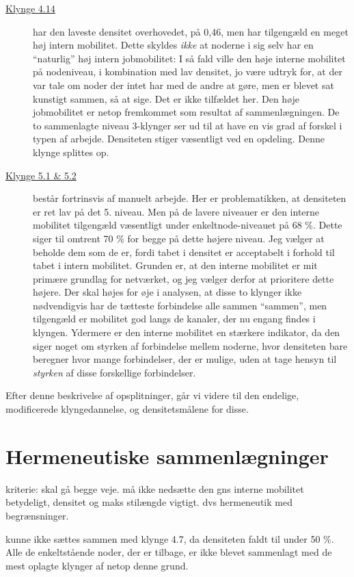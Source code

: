 \begin{description}
    \item[\underline{Klynge 4.14}] har den laveste densitet overhovedet, på 0,46, men har tilgengæld en meget høj intern mobilitet. Dette skyldes \emph{ikke} at noderne i sig selv har en “naturlig” høj intern jobmobilitet: I så fald ville den høje interne mobilitet på nodeniveau, i kombination med lav densitet, jo være udtryk for, at der  var tale om noder der intet har med de andre at gøre, men er blevet sat kunstigt sammen, så at sige. Det er ikke tilfældet her. Den høje jobmobilitet er netop fremkommet som resultat af sammenlægningen. De to sammenlagte niveau 3-klynger ser ud til at have en vis grad af forskel i typen af arbejde. Densiteten stiger væsentligt ved en opdeling. Denne klynge splittes op. 

    \item[\underline{Klynge 5.1 \& 5.2}] består fortrinsvis af manuelt arbejde. Her er problematikken, at densiteten er ret lav på det 5. niveau. Men på de lavere niveauer er den interne mobilitet tilgengæld væsentligt under enkeltnode-niveauet på 68 \%. Dette siger til omtrent 70 \% for begge på dette højere niveau. Jeg vælger at beholde dem som de er, fordi tabet i densitet er acceptabelt i forhold til tabet i intern mobilitet. Grunden er, at den interne mobilitet er mit primære grundlag for netværket, og jeg vælger derfor at prioritere dette højere. Der skal højes for øje i analysen, at disse to klynger ikke nødvendigvis har de tætteste forbindelse alle sammen “sammen”, men tilgengæld er mobilitet god langs de kanaler, der nu engang findes i klyngen. Ydermere er den interne mobilitet en stærkere indikator, da den siger noget om styrken af forbindelse mellem noderne, hvor densiteten bare beregner hvor mange forbindelser, der er mulige, uden at tage hensyn til \emph{styrken} af disse forskellige forbindelser. 

\end{description}
% 
Efter denne beskrivelse af opsplitninger, går vi videre til den endelige, modificerede klyngedannelse, og densitetsmålene for disse. 


%
\section{Hermeneutiske sammenlægninger}
%

kriterie: skal gå begge veje. må ikke nedsætte den gns interne mobilitet betydeligt, densitet og maks stilængde vigtigt. dvs hermeneutik med begrænsninger. 


 kunne ikke sættes sammen med klynge 4.7, da densiteten faldt til under 50 \%.  Alle de enkeltstående noder, der er tilbage, er ikke blevet sammenlagt med de mest oplagte klynger af netop denne grund. 

